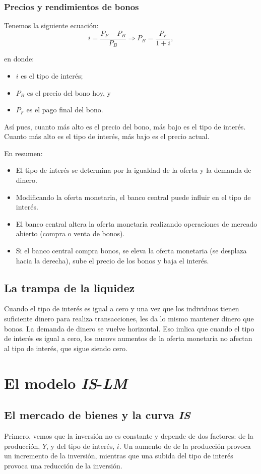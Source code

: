 \documentclass[10pt]{article}
\begin{document}
\begin{multicols*}{2}
\subsubsection{Precios y rendimientos de bonos}
Tenemos la siguiente ecuación:
\[ i = \frac{P_F - P_B}{P_B} \Longrightarrow P_B = \frac{P_F}{1+i},\]

en donde:
\begin{itemize}
    \item $i$ es el tipo de interés;
    \item $P_B$ es el precio del bono hoy, y
    \item $P_F$ es el pago final del bono.
\end{itemize}

Así pues, cuanto más alto es el precio del bono, más bajo es el tipo de interés. Cuanto más alto es el tipo de interés, más bajo es el precio actual.

En resumen:
\begin{itemize}
    \item El tipo de interés se determina por la igualdad de la oferta y la demanda de dinero.
    \item Modificando la oferta monetaria, el banco central puede influir en el tipo de interés.
    \item El banco central altera la oferta monetaria realizando operaciones de mercado abierto (compra o venta de bonos).
    \item Si el banco central compra bonos, se eleva la oferta monetaria (se desplaza hacia la derecha), sube el precio de los bonos y baja el interés.
\end{itemize}

\subsection{La trampa de la liquidez}
Cuando el tipo de interés es igual a cero y una vez que los individuos tienen suficiente dinero para realiza transacciones, les da lo mismo mantener dinero que bonos. La demanda de dinero se vuelve horizontal. Eso imlica que cuando el tipo de interés es igual a cero, los nueovs aumentos de la oferta monetaria no afectan al tipo de interés, que sigue siendo cero.

\section{El modelo \textit{IS}-\textit{LM}}
\subsection{El mercado de bienes y la curva \textit{IS}}
Primero, vemos que la inversión no es constante y depende de dos factores: de la producción, $Y$, y del tipo de interés, $i$. Un aumento de de la producción provoca un incremento de la inversión, mientras que una subida del tipo de interés provoca una reducción de la inversión.


\end{multicols*}
\end{document}
